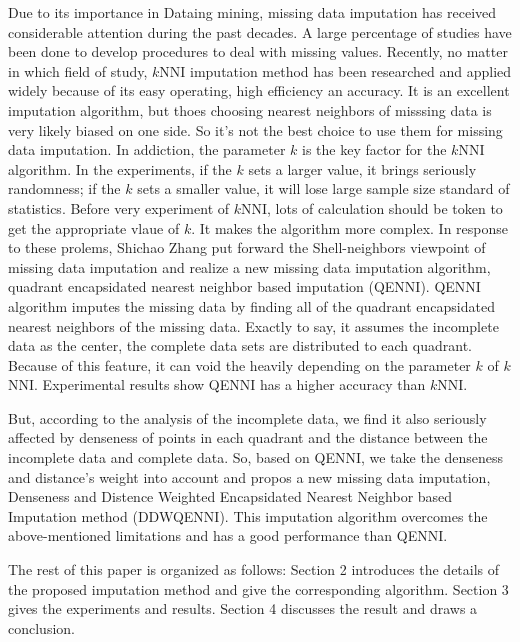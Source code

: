 \documentclass[print]{jicspack}
\begin{document}
Due to its importance in Dataing mining, missing data imputation has received considerable attention during the past decades. A large percentage of studies\cite{Research1,Research2,Research3,Research4,Research5} have been done to develop procedures to deal with missing values. Recently, no matter in which field of study, $k$NNI\cite{KNNI1,KNNI2,KNNI3,KNNI4} imputation method has been researched and applied widely because of its easy operating, high efficiency an accuracy. It is an excellent imputation algorithm, but thoes choosing nearest neighbors of misssing data is very likely biased on one side. So it's not the best choice to use them for missing data imputation. In addiction, the parameter $k$ is the key factor for the $k$NNI algorithm. In the experiments, if the $k$ sets a larger value, it brings seriously randomness; if the $k$ sets a smaller value, it will lose large sample size standard of statistics. Before very experiment of $k$NNI, lots of calculation should be token to get the appropriate vlaue of $k$. It makes the algorithm more complex. In response to these prolems, Shichao Zhang put forward the Shell-neighbors\cite{Shell} viewpoint of missing data imputation and realize a new missing data imputation algorithm, quadrant encapsidated nearest neighbor based imputation (QENNI). QENNI algorithm imputes the missing data by finding all of the quadrant encapsidated nearest neighbors of the missing data. Exactly to say, it assumes the incomplete data as the center, the complete data sets are distributed to each quadrant. Because of this feature, it can void the heavily depending on the parameter $k$ of $k$NNI. Experimental results show QENNI has a higher accuracy than $k$NNI.

But, according to the analysis of the incomplete data, we find it also seriously affected by denseness of points in each quadrant and the distance between the incomplete data and complete data. So, based on QENNI,  we take the denseness and distance's weight into account and propos a new missing data imputation, Denseness and Distence Weighted Encapsidated Nearest Neighbor based Imputation method (DDWQENNI). This imputation algorithm overcomes the above-mentioned limitations and has a good performance than QENNI.

The rest of this paper is organized as follows: Section 2 introduces the details of the proposed imputation method and give the corresponding algorithm. Section 3 gives the experiments and results. Section 4 discusses the result and draws a conclusion.
\end{document}
